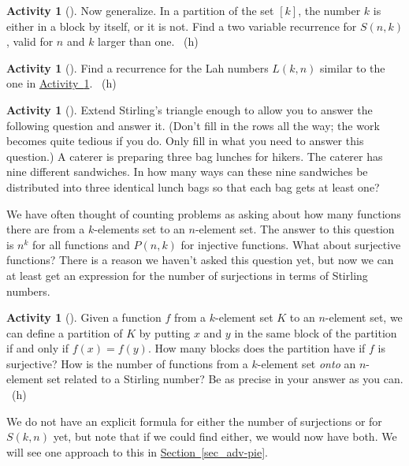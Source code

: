 \documentclass[10pt,]{book}
\theoremstyle{plain}
\theoremstyle{definition}
\theoremstyle{definition}
\theoremstyle{definition}
\newtheorem{activity}[project]{Activity}
\numberwithin{equation}{chapter}
\begin{document}
\begin{activity}[]\label{secondstirlingrecurrence}
\hypertarget{p-1088}{}%
Now generalize.  In a partition of the set \([k]\), the number \(k\) is either in a block by itself, or it is not.  Find a two variable recurrence for \(S(n,k)\), valid for \(n\) and \(k\) larger than one.%
~{\tiny (h)}\end{activity}
\begin{activity}[]\label{activity-194}
\hypertarget{p-1091}{}%
Find a recurrence for the Lah numbers \(L(k,n)\) similar to the one in \hyperref[secondstirlingrecurrence]{Activity~\ref{secondstirlingrecurrence}}.%
~{\tiny (h)}\end{activity}
\begin{activity}[]\label{sandwiches}
\hypertarget{p-1094}{}%
Extend Stirling's triangle enough to allow you to answer the following question and answer it. (Don't fill in the rows all the way; the work becomes quite tedious if you do. Only fill in what you need to answer this question.) A caterer is preparing three bag lunches for hikers. The caterer has nine different sandwiches. In how many ways can these nine sandwiches be distributed into three identical lunch bags so that each bag gets at least one?%
\end{activity}
\hypertarget{p-1096}{}%
We have often thought of counting problems as asking about how many functions there are from a \(k\)-elements set to an \(n\)-element set.  The answer to this question is \(n^k\) for all functions and \(P(n,k)\) for injective functions.  What about surjective functions?  There is a reason we haven't asked this question yet, but now we can at least get an expression for the number of surjections in terms of Stirling numbers.%
\begin{activity}[]\label{activity-196}
\hypertarget{p-1097}{}%
Given a function \(f\) from a \(k\)-element set \(K\) to an \(n\)-element set, we can define a partition of \(K\) by putting \(x\) and \(y\) in the same block of the partition if and only if \(f(x)=f(y)\). How many blocks does the partition have if \(f\) is surjective? How is the number of functions from a \(k\)-element set \emph{onto} an \(n\)-element set related to a Stirling number? Be as precise in your answer as you can.%
~{\tiny (h)}\end{activity}
\hypertarget{p-1100}{}%
We do not have an explicit formula for either the number of surjections or for \(S(k,n)\) yet, but note that if we could find either, we would now have both.  We will see one approach to this in \hyperref[sec_adv-pie]{Section~\ref{sec_adv-pie}}.%
\end{document}
